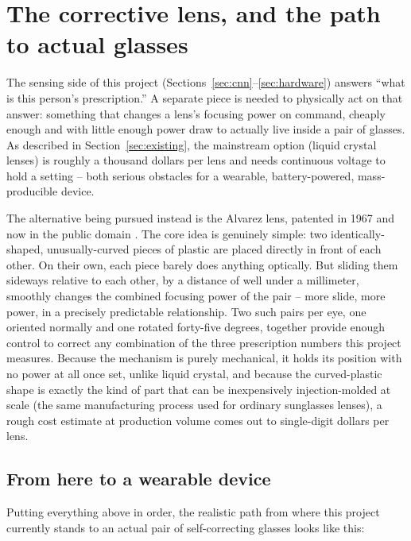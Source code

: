 \documentclass[11pt]{article}
\begin{document}
\section{The corrective lens, and the path to actual glasses}
\label{sec:innovation}

The sensing side of this project (Sections~\ref{sec:cnn}--\ref{sec:hardware}) answers ``what is this person's prescription.'' A separate piece is needed to physically act on that answer: something that changes a lens's focusing power on command, cheaply enough and with little enough power draw to actually live inside a pair of glasses. As described in Section~\ref{sec:existing}, the mainstream option (liquid crystal lenses) is roughly a thousand dollars per lens and needs continuous voltage to hold a setting -- both serious obstacles for a wearable, battery-powered, mass-producible device.

The alternative being pursued instead is the Alvarez lens, patented in 1967 and now in the public domain \cite{alvarez1967, barbero2011}. The core idea is genuinely simple: two identically-shaped, unusually-curved pieces of plastic are placed directly in front of each other. On their own, each piece barely does anything optically. But sliding them sideways relative to each other, by a distance of well under a millimeter, smoothly changes the combined focusing power of the pair -- more slide, more power, in a precisely predictable relationship. Two such pairs per eye, one oriented normally and one rotated forty-five degrees, together provide enough control to correct any combination of the three prescription numbers this project measures. Because the mechanism is purely mechanical, it holds its position with no power at all once set, unlike liquid crystal, and because the curved-plastic shape is exactly the kind of part that can be inexpensively injection-molded at scale (the same manufacturing process used for ordinary sunglasses lenses), a rough cost estimate at production volume comes out to single-digit dollars per lens.

\subsection{From here to a wearable device}
Putting everything above in order, the realistic path from where this project currently stands to an actual pair of self-correcting glasses looks like this:
\end{document}
